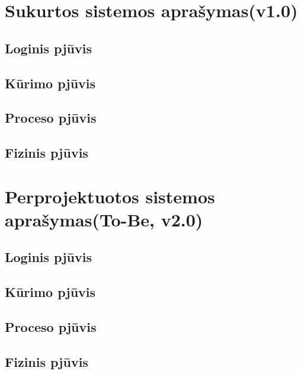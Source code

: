 \documentclass{VUMIFPSkursinis}
\begin{document}
\section{Sukurtos sistemos aprašymas(v1.0)}

\subsection{Loginis pjūvis}
	
 

	
	





\subsection{Kūrimo pjūvis}
\subsection{Proceso pjūvis}
\subsection{Fizinis pjūvis}

\section{Perprojektuotos sistemos aprašymas(To-Be, v2.0)}
\subsection{Loginis pjūvis}
\subsection{Kūrimo pjūvis}
\subsection{Proceso pjūvis}
\subsection{Fizinis pjūvis}


\end{document}
